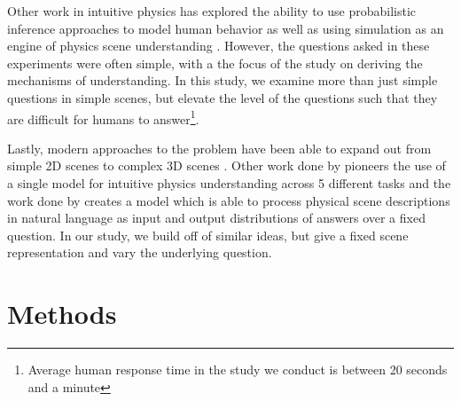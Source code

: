 \documentclass[10pt,letterpaper]{article}
\begin{document}
Other work in intuitive physics has explored the ability to use probabilistic inference approaches \cite{smith2013sources,smith2024intuitive} to model human behavior as well as using simulation as an engine of physics scene understanding \cite{battaglia2013simulation}. However, the questions asked in these experiments were often simple, with a the focus of the study on deriving the mechanisms of understanding. In this study, we examine more than just simple questions in simple scenes, but elevate the level of the questions such that they are difficult for humans to answer\footnote{Average human response time in the study we conduct is between 20 seconds and a minute}. 

Lastly, modern approaches to the problem have been able to expand out from simple 2D scenes to complex 3D scenes \cite{xue20233d}. Other work done by  pioneers the use of a single model for intuitive physics understanding across 5 different tasks and the work done by  creates a model which is able to process physical scene descriptions in natural language as input and output distributions of answers over a fixed question. In our study, we build off of similar ideas, but give a fixed scene representation and vary the underlying question. 

\section{Methods}
\end{document}
